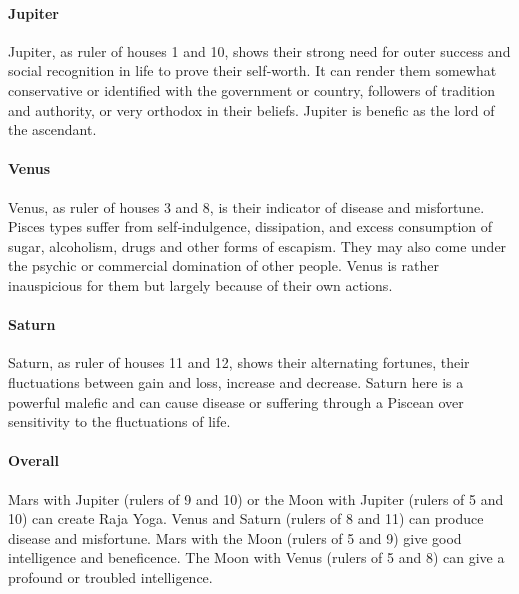  

\paragraph{Jupiter}

Jupiter, as ruler of houses 1 and 10, shows their strong need for outer success and social recognition in life to prove their self‑worth. It can render them somewhat conservative or identified with the government or country, followers of tradi­tion and authority, or very orthodox in their beliefs. Jupiter is benefic as the lord of the ascendant.

 

\paragraph{Venus}

Venus, as ruler of houses 3 and 8, is their indicator of disease and misfortune. Pisces types suffer from self‑indul­gence, dissipation, and excess consumption of sugar, alcoholism, drugs and other forms of escapism. They may also come under the psychic or commercial domination of other people. Venus is rather inauspicious for them but largely because of their own actions.

 

\paragraph{Saturn}

Saturn, as ruler of houses 11 and 12, shows their alternat­ing fortunes, their fluctuations between gain and loss, increase and decrease. Saturn here is a powerful malefic and can cause disease or suffering through a Piscean over sensitivity to the fluctuations of life.

 

\paragraph{Overall}

Mars with Jupiter (rulers of 9 and 10) or the Moon with Jupiter (rulers of 5 and 10) can create Raja Yoga. Venus and Saturn (rulers of 8 and 11) can produce disease and misfortune. Mars with the Moon (rulers of 5 and 9) give good intelligence and beneficence. The Moon with Venus (rulers of 5 and 8) can give a profound or troubled intelligence.

 

